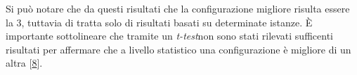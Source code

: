 Si può notare che da questi risultati che la configurazione migliore risulta essere la 3, tuttavia di tratta solo di risultati basati su determinate istanze. È importante sottolineare che tramite un \emph{t-test}\glsfirstoccur non sono stati rilevati sufficenti risultati per affermare che a livello statistico una configurazione è migliore di un altra [\hyperlink{bibliografia}{8}]. 





